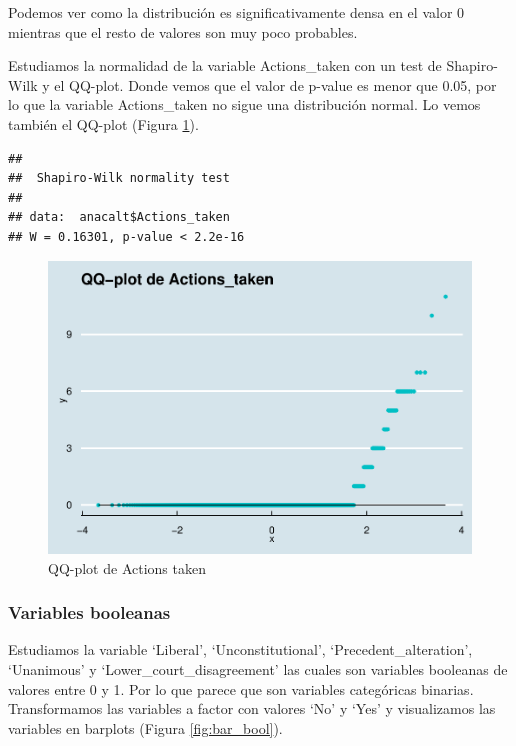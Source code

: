 \documentclass[
]{article}
\begin{document}
Podemos ver como la distribución es significativamente densa en el valor
0 mientras que el resto de valores son muy poco probables.

Estudiamos la normalidad de la variable Actions\_taken con un test de
Shapiro-Wilk y el QQ-plot. Donde vemos que el valor de p-value es menor
que 0.05, por lo que la variable Actions\_taken no sigue una
distribución normal. Lo vemos también el QQ-plot (Figura
\ref{fig:qq_at}).

\begin{verbatim}
## 
##  Shapiro-Wilk normality test
## 
## data:  anacalt$Actions_taken
## W = 0.16301, p-value < 2.2e-16
\end{verbatim}

\begin{figure}

{\centering \includegraphics[width=0.5\linewidth]{anacalt-regresion_files/figure-latex/qq_at-1} 

}

\caption{QQ-plot de Actions taken}\label{fig:qq_at}
\end{figure}

\hypertarget{variables-booleanas}{%
\subsubsection{Variables booleanas}\label{variables-booleanas}}

Estudiamos la variable `Liberal', `Unconstitutional',
`Precedent\_alteration', `Unanimous' y `Lower\_court\_disagreement' las
cuales son variables booleanas de valores entre 0 y 1. Por lo que parece
que son variables categóricas binarias. Transformamos las variables a
factor con valores `No' y `Yes' y visualizamos las variables en barplots
(Figura \ref{fig:bar_bool}).
\end{document}
